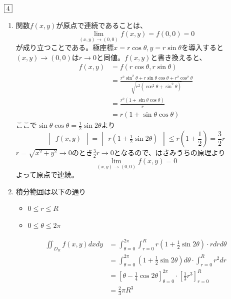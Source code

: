 \documentclass[dvipdfmx]{jsreport}
\begin{document}
\begin{souanswer} %
	$\fbox{4}$
\begin{enumerate}
	\item 関数$f(x, y)$が原点で連続であることは、
\begin{equation*}
	\lim_{(x, y)\to (0, 0)} f(x, y)= f(0, 0)= 0
\end{equation*}
	が成り立つことである。極座標$x= r\cos{\theta}, y= r\sin{\theta}$を導入すると$(x, y)\to (0, 0)$は$r\to 0$と同値。$f(x, y)$と書き換えると、
\begin{align*}
	f(x, y)
	&= f(r\cos{\theta}, r\sin{\theta})\\
	&= \frac{r^2\sin^2{\theta}+ r\sin{\theta}\cos{\theta}+ r^2\cos^2{\theta}}{\sqrt{r^2(\cos^2{\theta}+ \sin^2{\theta})}}\\
	&= \frac{r^2(1+ \sin{\theta}\cos{\theta})}{r}\\
	&= r(1+ \sin{\theta}\cos{\theta})
\end{align*}
	ここで$\sin{\theta}\cos{\theta}= \frac{1}{2}\sin{2\theta}$より
\begin{equation*}
	\begin{vmatrix}f(x, y)\end{vmatrix}= \begin{vmatrix}r\left(1+ \frac{1}{2}\sin{2\theta}\right)\end{vmatrix}\le r\left(1+ \frac{1}{2}\right)= \frac{3}{2}r
\end{equation*}
	$r= \sqrt{x^2+ y^2}\to 0$のとき$\frac{3}{2}r\to 0$となるので、はさみうちの原理より
\begin{equation*}
	\lim_{(x, y)\to (0, 0)} f(x, y)= 0
\end{equation*}
	よって原点で連続。

	\item 積分範囲は以下の通り
\begin{itemize}
	\item $0\le r\le R$
	\item $0\le \theta\le 2\pi$
\end{itemize}
\begin{align*}
	\iint_{D_R} f(x, y) dxdy
	&= \int_{\theta= 0}^{2\pi}\int_{r= 0}^R r\left(1+ \frac{1}{2}\sin{2\theta}\right)\cdot rdrd\theta\\
	&= \int_{\theta= 0}^{2\pi} \left(1+ \frac{1}{2}\sin{2\theta}\right)d\theta\cdot \int_{r= 0}^R r^2 dr\\
	&= \left[\theta- \frac{1}{4}\cos{2\theta}\right]_{\theta= 0}^{2\pi}\cdot \left[\frac{1}{3}r^3\right]_{r= 0}^ R\\
	&= \frac{2}{3}\pi R^3
\end{align*}
\end{enumerate}
\end{souanswer}
\end{document}
